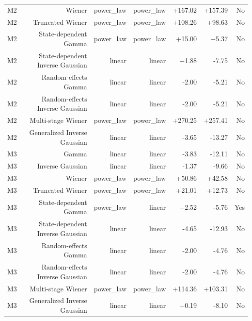 \begin{table}[t]
\begin{tabular}{lrrrrrr}
M2 & Wiener & power\_law & power\_law & +167.02 & +157.39 & No \\
M2 & Truncated Wiener & power\_law & power\_law & +108.26 & +98.63 & No \\
M2 & State-dependent Gamma & power\_law & power\_law & +15.00 & +5.37 & No \\
M2 & State-dependent Inverse Gaussian & linear & linear & +1.88 & -7.75 & No \\
M2 & Random-effects Gamma & linear & linear & -2.00 & -5.21 & No \\
M2 & Random-effects Inverse Gaussian & linear & linear & -2.00 & -5.21 & No \\
M2 & Multi-stage Wiener & power\_law & power\_law & +270.25 & +257.41 & No \\
M2 & Generalized Inverse Gaussian & linear & linear & -3.65 & -13.27 & No \\
M3 & Gamma & linear & linear & -3.83 & -12.11 & No \\
M3 & Inverse Gaussian & linear & linear & -1.37 & -9.66 & No \\
M3 & Wiener & power\_law & power\_law & +50.86 & +42.58 & No \\
M3 & Truncated Wiener & power\_law & power\_law & +21.01 & +12.73 & No \\
M3 & State-dependent Gamma & power\_law & linear & +2.52 & -5.76 & Yes \\
M3 & State-dependent Inverse Gaussian & linear & linear & -4.65 & -12.93 & No \\
M3 & Random-effects Gamma & linear & linear & -2.00 & -4.76 & No \\
M3 & Random-effects Inverse Gaussian & linear & linear & -2.00 & -4.76 & No \\
M3 & Multi-stage Wiener & power\_law & power\_law & +114.36 & +103.31 & No \\
M3 & Generalized Inverse Gaussian & linear & linear & +0.19 & -8.10 & No \\
\bottomrule
\end{tabular}
\end{table}
